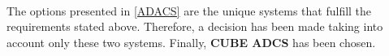 \paragraph{}The options presented in \ref{ADACS} are the unique systems that fulfill the requirements stated above. Therefore, a decision has been made taking into account only these two systems. Finally, \textbf{CUBE ADCS} has been chosen.